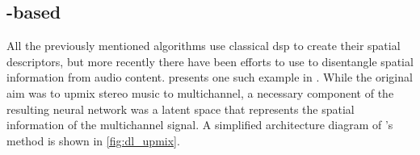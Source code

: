 \FloatBarrier

\subsection{-based }

All the previously mentioned algorithms use classical \gls{dsp} to create their spatial descriptors, but more recently there have been efforts to use  to disentangle spatial information from audio content. \citeauthor{yangUpmixingStyleTransfer2022} presents one such example in \cite{yangUpmixingStyleTransfer2022}. While the original aim was to upmix stereo music to multichannel, a necessary component of the resulting neural network was a latent space that represents the spatial information of the multichannel signal. A simplified architecture diagram of \citeauthor{yangUpmixingStyleTransfer2022}'s method is shown in \cref{fig:dl_upmix}.

